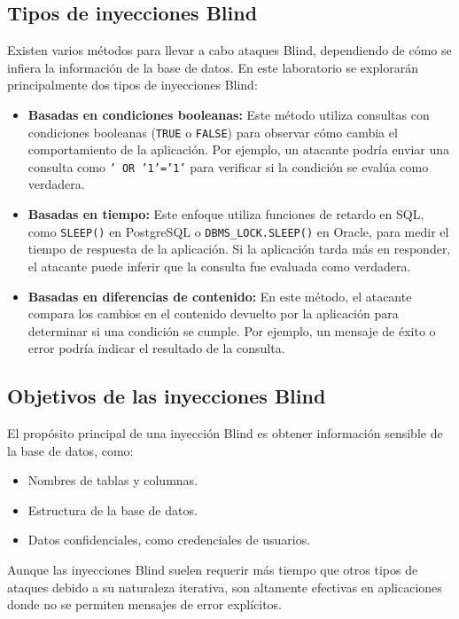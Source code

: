 \documentclass[a4paper,12pt]{article}
\begin{document}
\subsection{Tipos de inyecciones Blind}

Existen varios métodos para llevar a cabo ataques Blind, dependiendo de cómo se infiera la información de la base de datos. En este laboratorio se explorarán principalmente dos tipos de inyecciones Blind:

\begin{itemize}
    \item \textbf{Basadas en condiciones booleanas:}
    Este método utiliza consultas con condiciones booleanas (\texttt{TRUE} o \texttt{FALSE}) para observar cómo cambia el comportamiento de la aplicación. Por ejemplo, un atacante podría enviar una consulta como \texttt{' OR '1'='1'} para verificar si la condición se evalúa como verdadera.

    \item \textbf{Basadas en tiempo:}
    Este enfoque utiliza funciones de retardo en SQL, como \texttt{SLEEP()} en PostgreSQL o \texttt{DBMS\_LOCK.SLEEP()} en Oracle, para medir el tiempo de respuesta de la aplicación. Si la aplicación tarda más en responder, el atacante puede inferir que la consulta fue evaluada como verdadera.

    \item \textbf{Basadas en diferencias de contenido:}
    En este método, el atacante compara los cambios en el contenido devuelto por la aplicación para determinar si una condición se cumple. Por ejemplo, un mensaje de éxito o error podría indicar el resultado de la consulta.
\end{itemize}

\subsection{Objetivos de las inyecciones Blind}

El propósito principal de una inyección Blind es obtener información sensible de la base de datos, como:
\begin{itemize}
    \item Nombres de tablas y columnas.
    \item Estructura de la base de datos.
    \item Datos confidenciales, como credenciales de usuarios.
\end{itemize}

Aunque las inyecciones Blind suelen requerir más tiempo que otros tipos de ataques debido a su naturaleza iterativa, son altamente efectivas en aplicaciones donde no se permiten mensajes de error explícitos.
\end{document}
